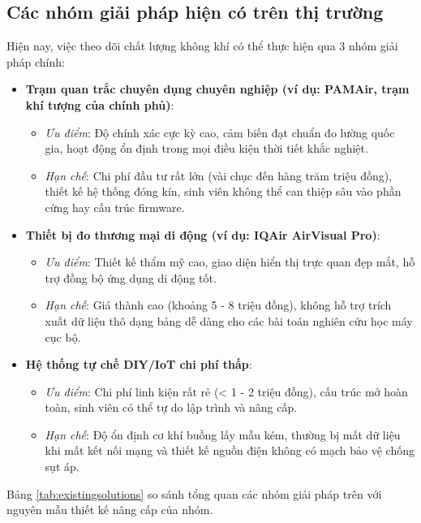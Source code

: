 \subsection{Các nhóm giải pháp hiện có trên thị trường}
Hiện nay, việc theo dõi chất lượng không khí có thể thực hiện qua 3 nhóm giải pháp chính:
\begin{itemize}
    \item \textbf{Trạm quan trắc chuyên dụng chuyên nghiệp (ví dụ: PAMAir, trạm khí tượng của chính phủ)}:
  \begin{itemize}
      \item \textit{Ưu điểm}: Độ chính xác cực kỳ cao, cảm biến đạt chuẩn đo lường quốc gia, hoạt động ổn định trong mọi điều kiện thời tiết khắc nghiệt.
      \item \textit{Hạn chế}: Chi phí đầu tư rất lớn (vài chục đến hàng trăm triệu đồng), thiết kế hệ thống đóng kín, sinh viên không thể can thiệp sâu vào phần cứng hay cấu trúc firmware.
    \end{itemize}
    \item \textbf{Thiết bị đo thương mại di động (ví dụ: IQAir AirVisual Pro)}:
  \begin{itemize}
      \item \textit{Ưu điểm}: Thiết kế thẩm mỹ cao, giao diện hiển thị trực quan đẹp mắt, hỗ trợ đồng bộ ứng dụng di động tốt.
      \item \textit{Hạn chế}: Giá thành cao (khoảng 5 - 8 triệu đồng), không hỗ trợ trích xuất dữ liệu thô dạng bảng dễ dàng cho các bài toán nghiên cứu học máy cục bộ.
    \end{itemize}
    \item \textbf{Hệ thống tự chế DIY/IoT chi phí thấp}:
  \begin{itemize}
      \item \textit{Ưu điểm}: Chi phí linh kiện rất rẻ (< 1 - 2 triệu đồng), cấu trúc mở hoàn toàn, sinh viên có thể tự do lập trình và nâng cấp.
      \item \textit{Hạn chế}: Độ ổn định cơ khí buồng lấy mẫu kém, thường bị mất dữ liệu khi mất kết nối mạng và thiết kế nguồn điện không có mạch bảo vệ chống sụt áp.
    \end{itemize}
\end{itemize}

Bảng \ref{tab:existingsolutions} so sánh tổng quan các nhóm giải pháp trên với nguyên mẫu thiết kế nâng cấp của nhóm.

